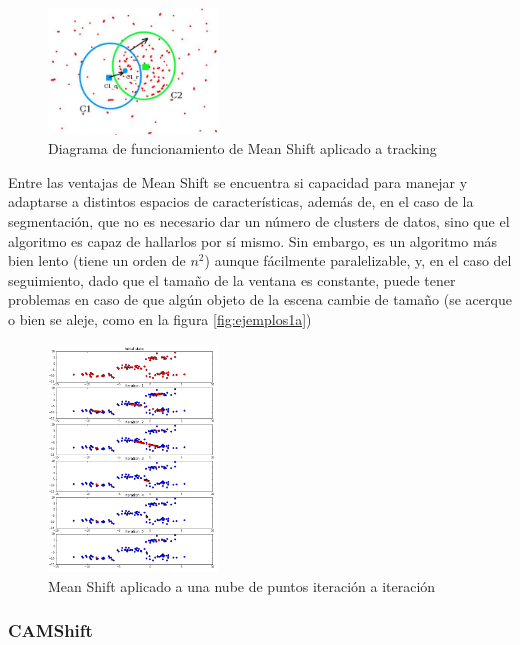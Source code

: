 \begin{figure}
    \centering
    \includegraphics[width=0.4\textwidth]{images/meanshiftopencv}
    \caption{Diagrama de funcionamiento de Mean Shift aplicado a tracking}
    \label{fig:meanshiftopencv}
\end{figure}


Entre las ventajas de Mean Shift se encuentra si capacidad para manejar y adaptarse a distintos espacios de características, además de, en el caso de la segmentación, que no es necesario dar un número de clusters de datos, sino que el algoritmo es capaz de hallarlos por sí mismo. Sin embargo, es un algoritmo más bien lento (tiene un orden de $n^2$) aunque fácilmente paralelizable, y, en el caso del seguimiento, dado que el tamaño de la ventana es constante, puede tener problemas en caso de que algún objeto de la escena cambie de tamaño (se acerque o bien se aleje, como en la figura \ref{fig:ejemplos1a})

\begin{figure}
  \centering
  \includegraphics[width=0.4\textwidth]{images/pasosmshift}
  \caption{Mean Shift aplicado a una nube de puntos iteración a iteración}
  \label{fig:pasosmshift}
\end{figure}

\subsubsection*{CAMShift}

